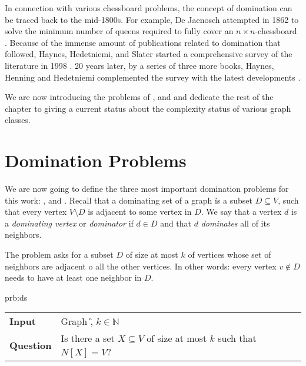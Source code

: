 In connection with various chessboard problems, the concept of domination can be traced back to the mid-1800s.
For example, De Jaenosch attempted in 1862 to solve the minimum number of queens required to fully cover an $n \times n$-chessboard \cite{Jaenisch1862}.
Because of the immense amount of publications related to domination that followed, Haynes, Hedetniemi, and Slater started a comprehensive survey of the literature in 1998 \cite{Haynes1998, Haynes1998b}. 
20 years later, by a series of three more books, Haynes, Henning and Hedetniemi complemented the survey with the latest developments \cite{Haynes2020, Haynes2021, Haynes2022}.

We are now introducing the problems of \dom, \sdom and \tdom and dedicate the rest of the chapter to giving a current status about the complexity status of various graph classes. 




\section{Domination Problems}

We are now going to define the three most important domination problems for this work: \dom, \sdom and \tdom.
Recall that a dominating set of a graph \G is a subset $D \subseteq V$, such that every vertex $V \setminus D$ is adjacent to some vertex in $D$.
We say that a vertex $d$ is a \textit{dominating vertex} or \textit{dominator} if $d \in D$ and that $d$ \textit{dominates} all of its neighbors.

The \dom problem asks for a subset $D$ of size at most $k$ of vertices whose set of neighbors are adjacent o all the other vertices.
In other words: every vertex $v \notin D$ needs to have at least one neighbor in $D$.

\begin{prb}{prb:ds}
    \begin{tabularx}{1.0\textwidth}{>{\hsize=0.30\hsize}X>{\hsize=0.8\hsize}X}
        \textbf{Input} & Graph \G, $k \in \mathbb{N}$\\
        \textbf{Question} & Is there a set {$X \subseteq V$} of size at most $k$ such that ${N[X] = V}$? \\
    \end{tabularx}
\end{prb}

